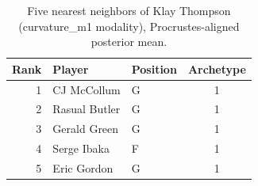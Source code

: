 \begin{table}[htbp]
  \centering\small
  \begin{tabular}{rllc}
    \toprule
    Rank & Player & Position & Archetype \\
    \midrule
    1 & CJ McCollum & G & 1 \\
    2 & Rasual Butler & G & 1 \\
    3 & Gerald Green & G & 1 \\
    4 & Serge Ibaka & F & 1 \\
    5 & Eric Gordon & G & 1 \\
    \bottomrule
  \end{tabular}
  \caption{Five nearest neighbors of Klay Thompson (curvature_m1 modality), Procrustes-aligned posterior mean.}
  \label{tab:Klay_Thompson_neighbors_curvature_m1}
\end{table}


